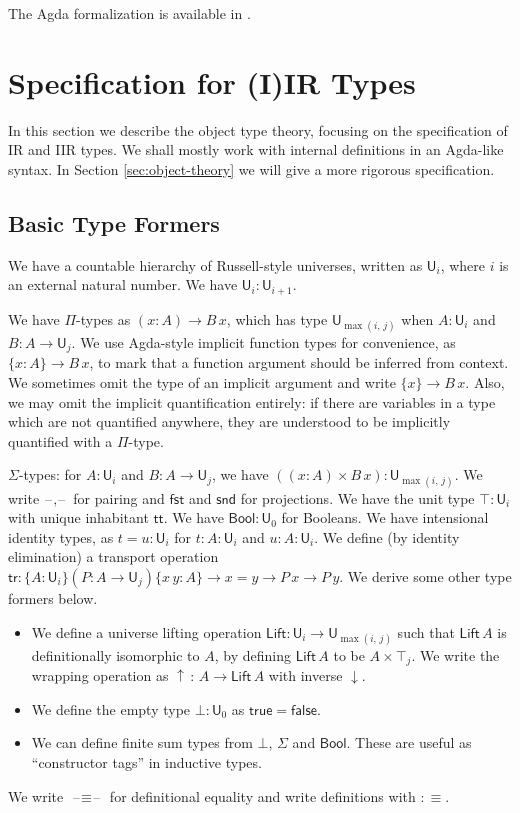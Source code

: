 \documentclass[acmsmall,screen,review]{acmart}
\newcommand{\msf}[1]{{\mathsf{#1}}}
\newcommand{\U}{\msf{U}}
\newcommand{\Lift}{\msf{Lift}}
\newcommand{\lup}{\uparrow}
\newcommand{\ldown}{\downarrow}
\newcommand{\ttt}{\msf{tt}}
\newcommand{\blank}{{\mathord{\hspace{1pt}\text{--}\hspace{1pt}}}}
\newcommand{\tr}{\msf{tr}}
\newcommand{\fst}{\msf{fst}}
\newcommand{\snd}{\msf{snd}}
\newcommand{\Bool}{\msf{Bool}}
\newcommand{\true}{\msf{true}}
\newcommand{\false}{\msf{false}}
\begin{document}
The Agda formalization is available in \cite{TODO}.

\section{Specification for (I)IR Types}\label{sec:specification}

In this section we describe the object type theory, focusing on the specification of IR and IIR
types. We shall mostly work with internal definitions in an Agda-like syntax. In Section
\ref{sec:object-theory} we will give a more rigorous specification.

\subsection{Basic Type Formers}\label{sec:basic-type-formers}
We have a countable hierarchy of Russell-style universes, written as $\U_i$, where $i$ is an
external natural number. We have $\U_i : \U_{i + 1}$.

We have $\Pi$-types as $(x : A) \to B\,x$, which has type $\U_{\max(i,\,j)}$ when $A : \U_i$ and $B
: A \to \U_j$. We use Agda-style implicit function types for convenience, as $\{x : A\} \to B\,x$,
to mark that a function argument should be inferred from context. We sometimes omit the type of an
implicit argument and write $\{x\} \to B\,x$.  Also, we may omit the implicit quantification
entirely: if there are variables in a type which are not quantified anywhere, they are understood
to be implicitly quantified with a $\Pi$-type.

$\Sigma$-types: for $A : \U_i$ and $B : A \to \U_j$, we have $((x : A) \times B\,x) :
\U_{\max(i,\,j)}$.  We write $\blank,\blank$ for pairing and $\fst$ and $\snd$ for projections. We
have the unit type $\top : \U_i$ with unique inhabitant $\ttt$. We have $\Bool : \U_0$ for
Booleans. We have intensional identity types, as $t = u : \U_i$ for $t : A : \U_i$ and $u : A : \U_i$. We define (by
identity elimination) a transport operation $\tr : \{A : \U_i\}(P : A \to \U_j)\{x\,y : A\} \to x =
y \to P\,x \to P\,y$. We derive some other type formers below.
\begin{itemize}
  \item We define a universe lifting operation $\Lift : \U_i \to \U_{\max(i,\,j)}$ such that
    $\Lift\,A$ is definitionally isomorphic to $A$, by defining $\Lift\,A$ to be $A \times \top_j$. We
    write the wrapping operation as $\lup\,:\,A \to \Lift\,A$ with inverse $\ldown$.
  \item We define the empty type $\bot : \U_0$ as $\true = \false$.
  \item We can define finite sum types from $\bot$, $\Sigma$ and $\Bool$. These are useful
    as ``constructor tags'' in inductive types.
\end{itemize}
We write $\blank\!\!\equiv\!\!\blank$ for definitional equality and write definitions with $:\equiv$.
\end{document}
